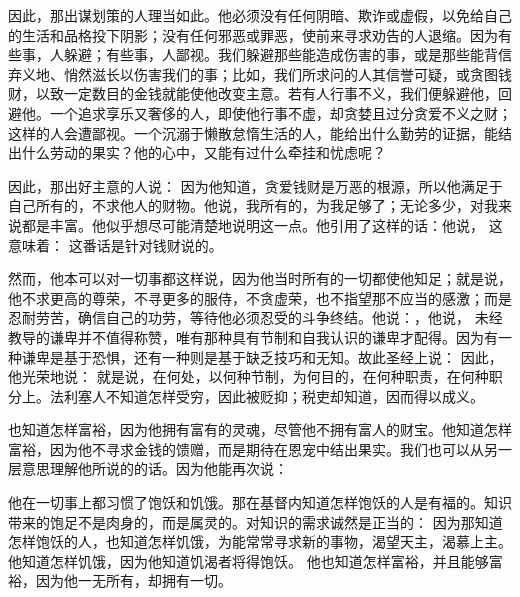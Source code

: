 因此，那出谋划策的人理当如此。他必须没有任何阴暗、欺诈或虚假，以免给自己的生活和品格投下阴影；没有任何邪恶或罪恶，使前来寻求劝告的人退缩。因为有些事，人躲避；有些事，人鄙视。我们躲避那些能造成伤害的事，或是那些能背信弃义地、悄然滋长以伤害我们的事；比如，我们所求问的人其信誉可疑，或贪图钱财，以致一定数目的金钱就能使他改变主意。若有人行事不义，我们便躲避他，回避他。一个追求享乐又奢侈的人，即使他行事不虚，却贪婪且过分贪爱不义之财；这样的人会遭鄙视。一个沉溺于懒散怠惰生活的人，能给出什么勤劳的证据，能结出什么劳动的果实？他的心中，又能有过什么牵挂和忧虑呢？\par

因此，那出好主意的人说： 因为他知道，贪爱钱财是万恶的根源，所以他满足于自己所有的，不求他人的财物。他说，我所有的，为我足够了；无论多少，对我来说都是丰富。他似乎想尽可能清楚地说明这一点。他引用了这样的话：他说， 这意味着： 这番话是针对钱财说的。\par

然而，他本可以对一切事都这样说，因为他当时所有的一切都使他知足；就是说，他不求更高的尊荣，不寻更多的服侍，不贪虚荣，也不指望那不应当的感激；而是忍耐劳苦，确信自己的功劳，等待他必须忍受的斗争终结。他说：，他说， 未经教导的谦卑并不值得称赞，唯有那种具有节制和自我认识的谦卑才配得。因为有一种谦卑是基于恐惧，还有一种则是基于缺乏技巧和无知。故此圣经上说： 因此，他光荣地说： 就是说，在何处，以何种节制，为何目的，在何种职责，在何种职分上。法利塞人不知道怎样受穷，因此被贬抑；税吏却知道，因而得以成义。\par

也知道怎样富裕，因为他拥有富有的灵魂，尽管他不拥有富人的财宝。他知道怎样富裕，因为他不寻求金钱的馈赠，而是期待在恩宠中结出果实。我们也可以从另一层意思理解他所说的的话。因为他能再次说：\par

他在一切事上都习惯了饱饫和饥饿。那在基督内知道怎样饱饫的人是有福的。知识带来的饱足不是肉身的，而是属灵的。对知识的需求诚然是正当的： 因为那知道怎样饱饫的人，也知道怎样饥饿，为能常常寻求新的事物，渴望天主，渴慕上主。他知道怎样饥饿，因为他知道饥渴者将得饱饫。 他也知道怎样富裕，并且能够富裕，因为他一无所有，却拥有一切。\par

